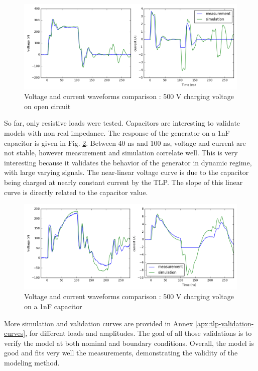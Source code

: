 \begin{figure}[!h]
  \centering
  \includegraphics[width=\textwidth]{src/2/figures/tlp_comparison_open_500V.png}
  \caption{Voltage and current waveforms comparison : 500 V charging voltage on open circuit}
  \label{fig:comparison-tlp-open}
\end{figure}

So far, only resistive loads were tested.
Capacitors are interesting to validate models with non real impedance.
The response of the generator on a 1nF capacitor is given in Fig. \ref{fig:comparison-tlp-capa}.
Between 40 ns and 100 ns, voltage and current are not stable, however measurement and simulation correlate well.
This is very interesting because it validates the behavior of the generator in dynamic regime, with large varying signals.
The near-linear voltage curve is due to the capacitor being charged at nearly constant current by the TLP.
The slope of this linear curve is directly related to the capacitor value.

\begin{figure}[!h]
  \centering
  \includegraphics[width=\textwidth]{src/2/figures/tlp_comparison_1nF_500V.png}
  \caption{Voltage and current waveforms comparison : 500 V charging voltage on a 1nF capacitor}
  \label{fig:comparison-tlp-capa}
\end{figure}

More simulation and validation curves are provided in Annex \ref{apx:tlp-validation-curves}, for different loads and amplitudes.
The goal of all those validations is to verify the model at both nominal and boundary conditions.
Overall, the model is good and fits very well the measurements, demonstrating the validity of the modeling method.

